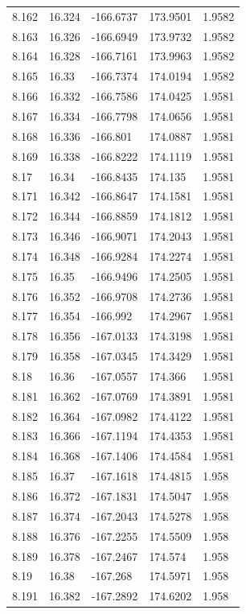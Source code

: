 \begin{tabular}{lllll}
8.162 & 16.324 & -166.6737 & 173.9501 & 1.9582 \\
8.163 & 16.326 & -166.6949 & 173.9732 & 1.9582 \\
8.164 & 16.328 & -166.7161 & 173.9963 & 1.9582 \\
8.165 & 16.33 & -166.7374 & 174.0194 & 1.9582 \\
8.166 & 16.332 & -166.7586 & 174.0425 & 1.9581 \\
8.167 & 16.334 & -166.7798 & 174.0656 & 1.9581 \\
8.168 & 16.336 & -166.801 & 174.0887 & 1.9581 \\
8.169 & 16.338 & -166.8222 & 174.1119 & 1.9581 \\
8.17 & 16.34 & -166.8435 & 174.135 & 1.9581 \\
8.171 & 16.342 & -166.8647 & 174.1581 & 1.9581 \\
8.172 & 16.344 & -166.8859 & 174.1812 & 1.9581 \\
8.173 & 16.346 & -166.9071 & 174.2043 & 1.9581 \\
8.174 & 16.348 & -166.9284 & 174.2274 & 1.9581 \\
8.175 & 16.35 & -166.9496 & 174.2505 & 1.9581 \\
8.176 & 16.352 & -166.9708 & 174.2736 & 1.9581 \\
8.177 & 16.354 & -166.992 & 174.2967 & 1.9581 \\
8.178 & 16.356 & -167.0133 & 174.3198 & 1.9581 \\
8.179 & 16.358 & -167.0345 & 174.3429 & 1.9581 \\
8.18 & 16.36 & -167.0557 & 174.366 & 1.9581 \\
8.181 & 16.362 & -167.0769 & 174.3891 & 1.9581 \\
8.182 & 16.364 & -167.0982 & 174.4122 & 1.9581 \\
8.183 & 16.366 & -167.1194 & 174.4353 & 1.9581 \\
8.184 & 16.368 & -167.1406 & 174.4584 & 1.9581 \\
8.185 & 16.37 & -167.1618 & 174.4815 & 1.958 \\
8.186 & 16.372 & -167.1831 & 174.5047 & 1.958 \\
8.187 & 16.374 & -167.2043 & 174.5278 & 1.958 \\
8.188 & 16.376 & -167.2255 & 174.5509 & 1.958 \\
8.189 & 16.378 & -167.2467 & 174.574 & 1.958 \\
8.19 & 16.38 & -167.268 & 174.5971 & 1.958 \\
8.191 & 16.382 & -167.2892 & 174.6202 & 1.958 \\

\end{tabular}

